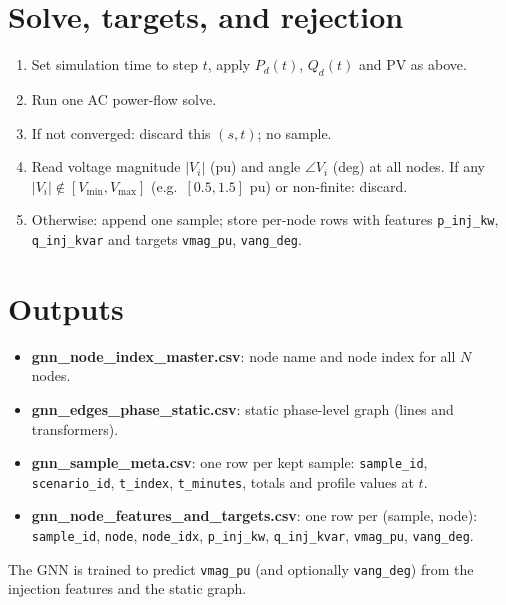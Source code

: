 \documentclass[11pt]{article}
\begin{document}
\section{Solve, targets, and rejection}

\begin{enumerate}[noitemsep]
  \item Set simulation time to step $t$, apply $P_d(t)$, $Q_d(t)$ and PV as above.
  \item Run one AC power-flow solve.
  \item If not converged: discard this $(s,t)$; no sample.
  \item Read voltage magnitude $|V_i|$ (pu) and angle $\angle V_i$ (deg) at all nodes. If any $|V_i| \notin [V_{\min}, V_{\max}]$ (e.g.\ $[0.5, 1.5]$ pu) or non-finite: discard.
  \item Otherwise: append one sample; store per-node rows with features \texttt{p\_inj\_kw}, \texttt{q\_inj\_kvar} and targets \texttt{vmag\_pu}, \texttt{vang\_deg}.
\end{enumerate}

\section{Outputs}

\begin{itemize}[noitemsep]
  \item \textbf{gnn\_node\_index\_master.csv}: node name and node index for all $N$ nodes.
  \item \textbf{gnn\_edges\_phase\_static.csv}: static phase-level graph (lines and transformers).
  \item \textbf{gnn\_sample\_meta.csv}: one row per kept sample: \texttt{sample\_id}, \texttt{scenario\_id}, \texttt{t\_index}, \texttt{t\_minutes}, totals and profile values at $t$.
  \item \textbf{gnn\_node\_features\_and\_targets.csv}: one row per (sample, node): \texttt{sample\_id}, \texttt{node}, \texttt{node\_idx}, \texttt{p\_inj\_kw}, \texttt{q\_inj\_kvar}, \texttt{vmag\_pu}, \texttt{vang\_deg}.
\end{itemize}
The GNN is trained to predict \texttt{vmag\_pu} (and optionally \texttt{vang\_deg}) from the injection features and the static graph.
\end{document}
